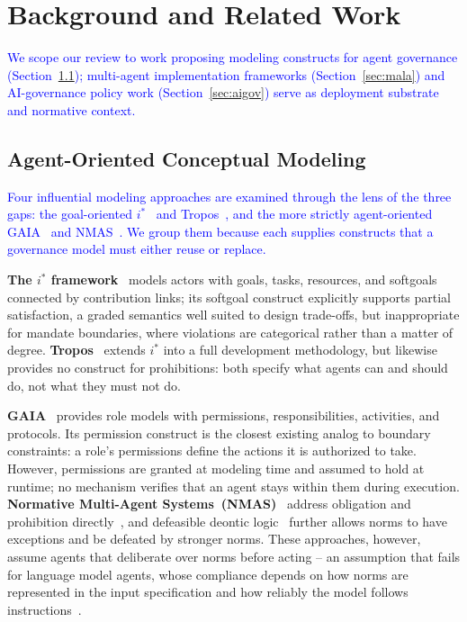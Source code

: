 \documentclass[runningheads]{llncs}
\begin{document}
\section{Background and Related Work}
\label{sec:background}

\textcolor{blue}{We scope our review to work proposing modeling constructs for agent governance (Section~\ref{sec:aomodeling}); multi-agent implementation frameworks (Section~\ref{sec:mala}) and AI-governance policy work (Section~\ref{sec:aigov}) serve as deployment substrate and normative context.}

\subsection{Agent-Oriented Conceptual Modeling}
\label{sec:aomodeling}

\textcolor{blue}{Four influential modeling approaches are examined through the lens of the three gaps: the goal-oriented $i^*$~\cite{yu2011social} and Tropos~\cite{bresciani2004tropos}, and the more strictly agent-oriented GAIA~\cite{wooldridge2000gaia} and NMAS~\cite{boella2006introduction}. We group them because each supplies constructs that a governance model must either reuse or replace.}

\textbf{The $i^*$ framework}~\cite{yu2011social} models actors with goals, tasks, resources, and softgoals connected by contribution links; its softgoal construct explicitly supports partial satisfaction, a graded semantics well suited to design trade-offs, but inappropriate for mandate boundaries, where violations are categorical rather than a matter of degree.
\textbf{Tropos}~\cite{bresciani2004tropos} extends $i^*$ into a full
development methodology, but likewise provides no construct for prohibitions: both specify what agents can and should do, not what they
must not do.

\textbf{GAIA}~\cite{wooldridge2000gaia} provides role models with permissions, responsibilities, activities, and protocols. Its permission construct is the closest existing analog to boundary constraints: a
role's permissions define the actions it is authorized to take. However, permissions are granted at modeling time and assumed to hold at runtime; no mechanism verifies that an agent stays within them during execution. 
\textbf{Normative Multi-Agent Systems~(NMAS)}~\cite{governatori2005meeting,boella2006introduction,dignum1999autonomous} address obligation and prohibition directly~\cite{vonwright1951essay}, and defeasible deontic logic~\cite{governatori2005meeting} further allows norms to have exceptions and
be defeated by stronger norms. These approaches, however, assume agents that
deliberate over norms before acting -- an assumption that fails for language model agents, whose compliance depends on how norms are represented in the input specification and how reliably the model follows instructions~\cite{huang2023selfcorrect}.
\end{document}

